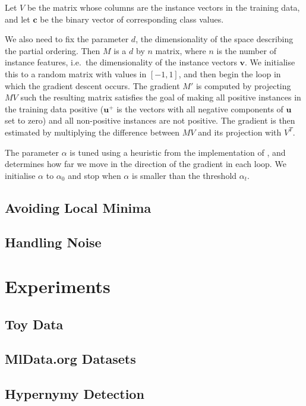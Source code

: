 \documentclass{article}
\begin{document}
Let $V$ be the matrix whose columns are the instance vectors in the
training data, and let $\mathbf{c}$ be the binary vector of
corresponding class values.

We also need to fix the parameter $d$, the dimensionality of the space
describing the partial ordering. Then $M$ is a $d$ by $n$ matrix,
where $n$ is the number of instance features, i.e.~the dimensionality
of the instance vectors $\mathbf{v}$. We initialise this to a random
matrix with values in $[-1,1]$, and then begin the loop in which the
gradient descent occurs. The gradient $M'$ is computed by projecting
$MV$ such the resulting matrix satisfies the goal of making all
positive instances in the training data positive ($\mathbf{u}^+$ is
the vectors with all negative components of $\mathbf{u}$ set to zero)
and all non-positive instances are not positive. The gradient is then
estimated by multiplying the difference between $MV$ and its
projection with $V^T$.

The parameter $\alpha$ is tuned using a heuristic from the
implementation of , and determines how far we move
in the direction of the gradient in each loop. We initialise $\alpha$
to $\alpha_0$ and stop when $\alpha$ is smaller than the threshold
$\alpha_t$.

\subsection{Avoiding Local Minima}

\subsection{Handling Noise}

\section{Experiments}

\subsection{Toy Data}

\subsection{MlData.org Datasets}

\subsection{Hypernymy Detection}
\end{document}
